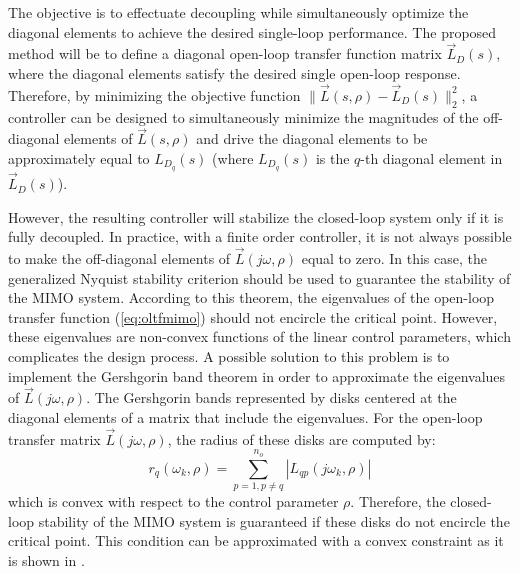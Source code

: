 \documentclass[default]{svmult}
\begin{document}
The objective is to effectuate decoupling while simultaneously optimize the diagonal elements to achieve the desired single-loop performance. The proposed method will be to define a diagonal open-loop transfer function matrix $\vec{L}_D(s)$, where the diagonal elements satisfy the desired single open-loop response. Therefore, by minimizing the objective function $\| \vec{L}(s,\rho)-\vec{L}_D(s) \|_{2}^{2}$, a controller can be designed to simultaneously  minimize the magnitudes of the off-diagonal elements of $\vec{L}(s,\rho)$ and drive the diagonal elements to be approximately equal to $L_{D_{q}}(s)$ (where $L_{D_{q}}(s)$ is the $q$-th diagonal element in $\vec{L}_D(s)$).

However, the resulting controller will stabilize the closed-loop system only if it is fully decoupled. In practice, with a finite order controller, it is not always possible to make the off-diagonal elements of  $\vec{L}(j\omega,\rho)$ equal to zero. In this case, the generalized Nyquist stability criterion should be used to guarantee the stability of the MIMO system. According to this theorem, the eigenvalues of the open-loop transfer function (\ref{eq:oltfmimo}) should not encircle the critical point. However, these eigenvalues are non-convex functions of the linear control parameters, which complicates the design process. A possible solution to this problem is to implement the Gershgorin band theorem in order to approximate the eigenvalues of $\vec{L}(j\omega,\rho)$. The Gershgorin bands represented by disks centered at the diagonal elements of a matrix that include the eigenvalues. For the open-loop transfer matrix $\vec{L}(j\omega,\rho)$, the radius of these disks are computed by: 
\begin{equation}
r_{q}(\omega_k,\rho)=\sum_{p=1,p\neq q}^{n_o} |L_{qp}(j\omega_k,\rho)| 
\end{equation}
which is convex with respect to the control parameter $\rho$. Therefore, the closed-loop stability of the MIMO system is guaranteed if these disks do not encircle the critical point. This condition can be approximated with a convex constraint as it is shown in \cite{GKL10b}.
\end{document}
